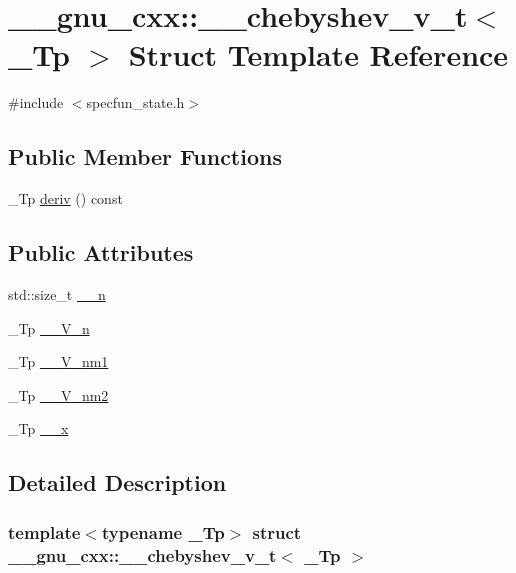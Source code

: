 \hypertarget{struct____gnu__cxx_1_1____chebyshev__v__t}{}\section{\+\_\+\+\_\+gnu\+\_\+cxx\+:\+:\+\_\+\+\_\+chebyshev\+\_\+v\+\_\+t$<$ \+\_\+\+Tp $>$ Struct Template Reference}
\label{struct____gnu__cxx_1_1____chebyshev__v__t}


{\ttfamily \#include $<$specfun\+\_\+state.\+h$>$}

\subsection*{Public Member Functions}
\begin{DoxyCompactItemize}
\item 
\+\_\+\+Tp \hyperlink{struct____gnu__cxx_1_1____chebyshev__v__t_a3ac7c3f4a04b5ec272f73c5dde89f218}{deriv} () const
\end{DoxyCompactItemize}
\subsection*{Public Attributes}
\begin{DoxyCompactItemize}
\item 
std\+::size\+\_\+t \hyperlink{struct____gnu__cxx_1_1____chebyshev__v__t_a067e7824e548f68733ae84d6e368ca48}{\+\_\+\+\_\+n}
\item 
\+\_\+\+Tp \hyperlink{struct____gnu__cxx_1_1____chebyshev__v__t_abb11b27e13fa8be8d19f9eb10e851e4e}{\+\_\+\+\_\+\+V\+\_\+n}
\item 
\+\_\+\+Tp \hyperlink{struct____gnu__cxx_1_1____chebyshev__v__t_af6a7e1e151961b9d214e84192683ddc9}{\+\_\+\+\_\+\+V\+\_\+nm1}
\item 
\+\_\+\+Tp \hyperlink{struct____gnu__cxx_1_1____chebyshev__v__t_a575f76c4163fdd8fe7cf3605c6921bfd}{\+\_\+\+\_\+\+V\+\_\+nm2}
\item 
\+\_\+\+Tp \hyperlink{struct____gnu__cxx_1_1____chebyshev__v__t_a58e22482d8e79ded483fa4816e959a5c}{\+\_\+\+\_\+x}
\end{DoxyCompactItemize}


\subsection{Detailed Description}
\subsubsection*{template$<$typename \+\_\+\+Tp$>$\newline
struct \+\_\+\+\_\+gnu\+\_\+cxx\+::\+\_\+\+\_\+chebyshev\+\_\+v\+\_\+t$<$ \+\_\+\+Tp $>$}

